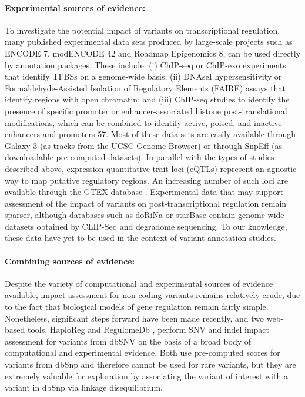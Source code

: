 \paragraph{Experimental sources of evidence:} To investigate the potential impact of variants on transcriptional regulation, many published experimental data sets produced by large-scale projects such as ENCODE 7, modENCODE 42 and Roadmap Epigenomics 8, can be used directly by annotation packages. These include: (i) ChIP-seq or ChIP-exo experiments that identify TFBSs on a genome-wide basis; (ii) DNAseI hypersensitivity or Formaldehyde-Assisted Isolation of Regulatory Elements (FAIRE) assays that identify regions with open chromatin; and (iii) ChIP-seq studies to identify the presence of specific promoter or enhancer-associated histone post-translational modifications, which can be combined to identify active, poised, and inactive enhancers and promoters 57. Most of these data sets are easily available through Galaxy 3 (as tracks from the UCSC Genome Browser) or through SnpEff (as downloadable pre-computed datasets). In parallel with the types of studies described above, expression quantitative trait loci (eQTLs) represent an agnostic way to map putative regulatory regions. An increasing number of such loci are available through the GTEX database  \cite{lonsdale2013genotype}. Experimental data that may support assessment of the impact of variants on post-transcriptional regulation remain sparser, although databases such as doRiNa  \cite{anders2011dorina} or starBase  \cite{yang2011starbase} contain genome-wide datasets obtained by CLIP-Seq and degradome sequencing. To our knowledge, these data have yet to be used in the context of variant annotation studies.

\paragraph{Combining sources of evidence:} Despite the variety of computational and experimental sources of evidence available, impact assessment for non-coding variants remains relatively crude, due to the fact that biological models of gene regulation remain fairly simple. Nonetheless, significant steps forward have been made recently, and two web-based tools, HaploReg  \cite{ward2012haploreg} and RegulomeDb  \cite{boyle2012annotation}, perform SNV and indel impact assessment for variants from dbSNV on the basis of a broad body of computational and experimental evidence. Both use pre-computed scores for variants from dbSnp and therefore cannot be used for rare variants, but they are extremely valuable for exploration by associating the variant of interest with a variant in dbSnp via linkage disequilibrium. 

